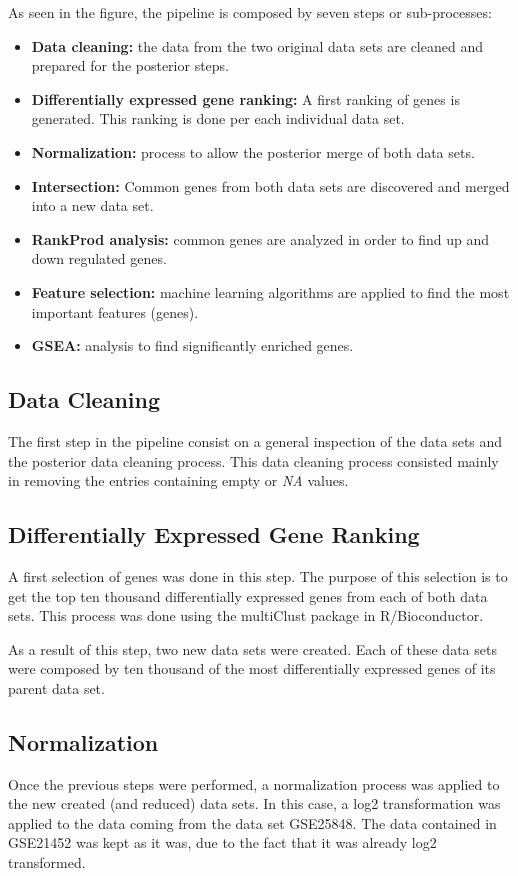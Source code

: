 As seen in the figure, the pipeline is composed by seven steps or sub-processes:

\begin{itemize}
    \item \textbf{Data cleaning:} the data from the two original data sets are cleaned and prepared for the posterior steps.
    \item \textbf{Differentially expressed gene ranking:} A first ranking of genes is generated. This ranking is done per each individual data set.
    \item \textbf{Normalization:} process to allow the posterior merge of both data sets.
    \item \textbf{Intersection:} Common genes from both data sets are discovered and merged into a new data set.
    \item \textbf{RankProd analysis:} common genes are analyzed in order to find up and down regulated genes.
    \item \textbf{Feature selection:} machine learning algorithms are applied to find the most important features (genes).
    \item \textbf{GSEA:} analysis to find significantly enriched genes.
\end{itemize}

\subsection{Data Cleaning}
The first step in the pipeline consist on a general inspection of the data sets and the posterior data cleaning process. This data cleaning process consisted mainly in removing the entries containing empty or \textit{NA} values.

\subsection{Differentially Expressed Gene Ranking}

A first selection of genes was done in this step. The purpose of this selection is to get the top ten thousand differentially expressed genes from each of both data sets.
This process was done using the multiClust\cite{multiClust} package in R/Bioconductor.

As a result of this step, two new data sets were created. Each of these data sets were composed by ten thousand of the most differentially expressed genes of its parent data set. 

\subsection{Normalization}
Once the previous steps were performed, a normalization process was applied to the new created (and reduced) data sets. In this case, a log2 transformation was applied to the data coming from the data set GSE25848. The data contained in GSE21452 was kept as it was, due to the fact that it was already log2 transformed.

